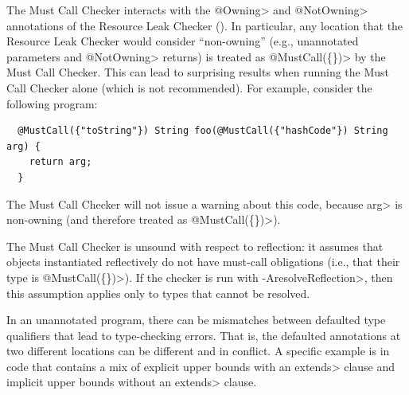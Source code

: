 



The Must Call Checker interacts with the \<@Owning> and \<@NotOwning> annotations of the
Resource Leak Checker (). In particular, any location that
the Resource Leak Checker would consider ``non-owning'' (e.g., unannotated parameters and \<@NotOwning>
returns) is treated as \<@MustCall(\{\})> by the Must Call Checker. This can lead to surprising
results when running the Must Call Checker alone (which is not recommended). For example,
consider the following program:

\begin{Verbatim}
  @MustCall({"toString"}) String foo(@MustCall({"hashCode"}) String arg) {
    return arg;
  }
\end{Verbatim}

The Must Call Checker will not issue a warning about this code, because \<arg>
is non-owning (and therefore treated as \<@MustCall(\{\})>).



The Must Call Checker is unsound with respect to reflection: it assumes
that objects instantiated reflectively do not have must-call obligations (i.e., that their
type is \<@MustCall(\{\})>). If the checker is run with \<-AresolveReflection>, then
this assumption applies only to types that cannot be resolved.


In an unannotated program, there can be mismatches between defaulted type
qualifiers that lead to type-checking errors.  That is, the defaulted
annotations at two different locations can be different and in conflict.  A
specific example is in code that contains a mix of explicit upper bounds
with an \<extends> clause and implicit upper bounds without an \<extends>
clause.

